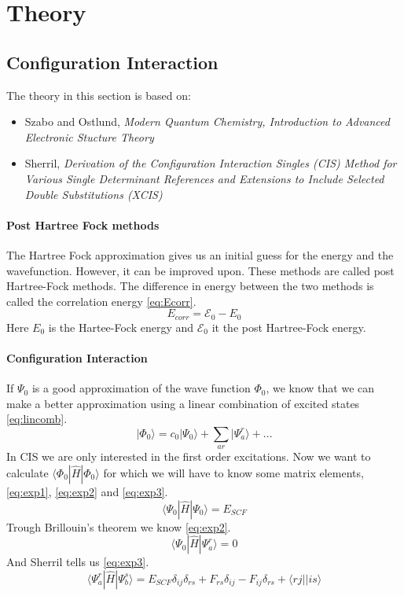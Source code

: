 \section{Theory}

\subsection{Configuration Interaction}

The theory in this section is based on:
\begin{itemize}
    \item Szabo and Ostlund, \textit{Modern Quantum Chemistry, Introduction to Advanced Electronic Stucture Theory}
    \item Sherril, \textit{Derivation of the Configuration Interaction Singles (CIS) Method for Various Single Determinant References and Extensions to Include Selected Double Substitutions (XCIS)}
\end{itemize}

\paragraph{Post Hartree Fock methods}
The Hartree Fock approximation gives us an initial guess for the energy and the wavefunction. However, it can be improved upon. These methods are called post Hartree-Fock methods. The difference in energy between the two methods is called the correlation energy \eqref{eq:Ecorr}.
\begin{equation}\label{eq:Ecorr}
    E_{corr} = \mathcal{E}_0 - E_0
\end{equation}
Here $E_0$ is the Hartee-Fock energy and $\mathcal{E}_0$ it the post Hartree-Fock energy.

\paragraph{Configuration Interaction}
If $\Psi_0$ is a good approximation of the wave function $\Phi_0$, we know that we can make a better approximation using a linear combination of excited states \eqref{eq:lincomb}.
\begin{equation}\label{eq:lincomb}
    |\Phi_0\rangle = c_0|\Psi_0\rangle + \sum_{ar}|\Psi_a^r\rangle + ...
\end{equation}
In CIS we are only interested in the first order excitations. Now we want to calculate $\langle\Phi_0|\hat{H}|\Phi_0\rangle$ for which we will have to know some matrix elements, \eqref{eq:exp1}, \eqref{eq:exp2} and \eqref{eq:exp3}.
\begin{equation}\label{eq:exp1}
    \langle\Psi_0|\hat{H}|\Psi_0\rangle = E_{SCF}
\end{equation}
Trough Brillouin's theorem we know \eqref{eq:exp2}.
\begin{equation}\label{eq:exp2}
    \langle\Psi_0|\hat{H}|\Psi_a^r\rangle = 0
\end{equation}
And Sherril tells us \eqref{eq:exp3}.
\begin{equation}\label{eq:exp3}
    \langle\Psi_a^r|\hat{H}|\Psi_b^s\rangle = E_{SCF}\delta_{ij}\delta_{rs} + F_{rs}\delta_{ij} - F_{ij}\delta_{rs} + \langle rj||is\rangle
\end{equation}
